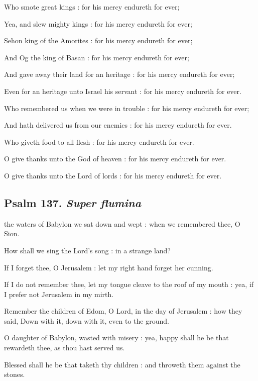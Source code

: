 Who smote great kings : for his mercy endureth for ever;\par
{}Yea, and slew mighty kings : for his mercy endureth for ever;\par
{}Sehon king of the Amorites : for his mercy endureth for ever;\par
{}And Og the king of Basan : for his mercy endureth for ever;\par
{}And gave away their land for an heritage : for his mercy endureth for ever;\par
{}Even for an heritage unto Israel his servant : for his mercy endureth for ever.\par
{}Who remembered us when we were in trouble : for his mercy endureth for ever;\par
{}And hath delivered us from our enemies : for his mercy endureth for ever.\par
{}Who giveth food to all flesh : for his mercy endureth for ever.\par
{}O give thanks unto the God of heaven : for his mercy endureth for ever.\par
{}O give thanks unto the Lord of lords : for his mercy endureth for ever.\par


\vspace{-0.25\baselineskip}

\subsection{Psalm 137. \textit{Super flumina}}

 the waters of Babylon we sat down and wept : when we remembered thee, O Sion.\par
{}
How shall we sing the Lord's song : in a strange land?\par
{}If I forget thee, O Jerusalem : let my right hand forget her cunning.\par
{}If I do not remember thee, let my tongue cleave to the roof of my mouth : yea, if I prefer not Jerusalem in my mirth.\par
{}Remember the children of Edom, O Lord, in the day of Jerusalem : how they said, Down with it, down with it, even to the ground.\par
{}O daughter of Babylon, wasted with misery : yea, happy shall he be that rewardeth thee, as thou hast served us.\par
{}Blessed shall he be that taketh thy children : and throweth them against the stones.\par


